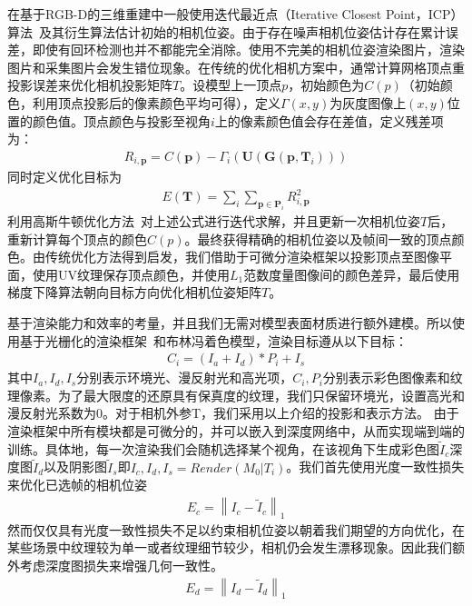 在基于RGB-D的三维重建中一般使用迭代最近点（Iterative Closest Point，ICP）算法~\cite{besl1992method,chen1992object}及其衍生算法估计初始的相机位姿。由于存在噪声相机位姿估计存在累计误差，即使有回环检测也并不都能完全消除。使用不完美的相机位姿渲染图片，渲染图片和采集图片会发生错位现象。在传统的优化相机方案中，通常计算网格顶点重投影误差来优化相机投影矩阵$T$。设模型上一顶点$p$，初始颜色为$C(p)$（初始颜色，利用顶点投影后的像素颜色平均可得），定义$\Gamma(x,y) $为灰度图像上$(x,y)$位置的颜色值。顶点颜色与投影至视角$i$上的像素颜色值会存在差值，定义残差项为：
\begin{align}
	R_{i, \mathbf{p}}=C(\mathbf{p})-\Gamma_{i}\left(\mathbf{U}\left(\mathbf{G}\left(\mathbf{p}, \mathbf{T}_{i}\right)\right)\right)
\end{align}
同时定义优化目标为
\begin{align}
	E(\mathbf{T})=\sum_{i} \sum_{\mathbf{p} \in \mathbf{P}_{i}} R_{i, \mathbf{p}}^{2}
\end{align}
利用高斯牛顿优化方法~\cite{wedderburn1974quasi}对上述公式进行迭代求解，并且更新一次相机位姿$T$后，重新计算每个顶点的颜色$C(p)$。最终获得精确的相机位姿以及帧间一致的顶点颜色。由传统优化方法得到启发，我们借助于可微分渲染框架以投影顶点至图像平面，使用UV纹理保存顶点颜色，并使用$L_1$范数度量图像间的颜色差异，最后使用梯度下降算法朝向目标方向优化相机位姿矩阵$T$。\par
基于渲染能力和效率的考量，并且我们无需对模型表面材质进行额外建模。所以使用基于光栅化的渲染框架~\cite{ravi2020pytorch3d}和布林冯着色模型，渲染目标遵从以下目标：
\begin{align}
	C_i = (I_a + I_d) * P_i + I_s
\end{align}
其中$I_a,I_d,I_s$分别表示环境光、漫反射光和高光项，$C_i,P_i$分别表示彩色图像素和纹理像素。为了最大限度的还原具有保真度的纹理，我们只保留环境光，设置高光和漫反射光系数为0。对于相机外参T，我们采用以上介绍的投影和表示方法。 由于渲染框架中所有模块都是可微分的，并可以嵌入到深度网络中，从而实现端到端的训练。具体地，每一次渲染我们会随机选择某个视角，在该视角下生成彩色图$\tilde{I}_c$深度图$\tilde{I}_d$以及阴影图$\tilde{I}_s$即$I_c,I_d,I_s = Render(M_0|T_i)$。我们首先使用光度一致性损失来优化已选帧的相机位姿
\begin{align}
	E_c = \left \| I_c - \tilde{I}_c  \right \|_1 
\end{align}
然而仅仅具有光度一致性损失不足以约束相机位姿以朝着我们期望的方向优化，在某些场景中纹理较为单一或者纹理细节较少，相机仍会发生漂移现象。因此我们额外考虑深度图损失来增强几何一致性。
\begin{align}
	E_d = \left \| I_d - \tilde{I}_d  \right \|_1 
\end{align}
